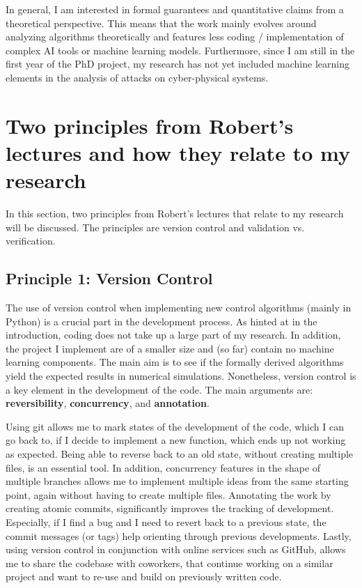 \documentclass[11pt]{article}
\begin{document}
In general, I am interested in formal guarantees and quantitative claims from a theoretical perspective. This means that the work mainly evolves around analyzing algorithms theoretically and features less coding / implementation of complex AI tools or machine learning models. 
Furthermore, since I am still in the first year of the PhD project, my research has not yet included machine learning elements in the analysis of attacks on cyber-physical systems. 

\section{Two principles from Robert's lectures and how they relate to my research}

In this section, two principles from Robert's lectures that relate to my research will be discussed. The principles are version control and validation vs. verification. 

\subsection{Principle 1: Version Control}

The use of version control when implementing new control algorithms (mainly in Python) is a crucial part in the development process.
As hinted at in the introduction, coding does not take up a large part of my research. In addition, the project I implement are of a smaller size and (so far) contain no machine learning components. 
The main aim is to see if the formally derived algorithms yield the expected results in numerical simulations. 
Nonetheless, version control is a key element in the development of the code. The main arguments are: \textbf{reversibility}, \textbf{concurrency}, and \textbf{annotation}.

Using git allows me to mark states of the development of the code, which I can go back to, if I decide to implement a new function, which ends up not working as expected. 
Being able to reverse back to an old state, without creating multiple files, is an essential tool. 
In addition, concurrency features in the shape of multiple branches allows me to implement multiple ideas from the same starting point, again without having to create multiple files. 
Annotating the work by creating atomic commits, significantly improves the tracking of development. Especially, if I find a bug and I need to revert back to a previous state, the commit messages (or tags) help orienting through previous developments. 
Lastly, using version control in conjunction with online services such as GitHub, allows me to share the codebase with coworkers, that continue working on a similar project and want to re-use and build on previously written code. 
\end{document}
